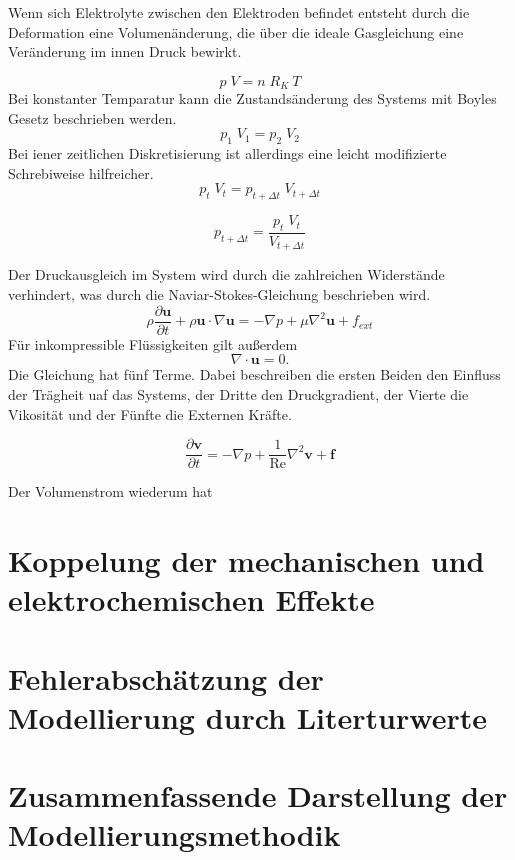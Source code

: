 Wenn sich Elektrolyte zwischen den Elektroden befindet entsteht durch die Deformation eine Volumenänderung, die über die ideale Gasgleichung eine Veränderung im innen Druck bewirkt.

\begin{equation}
    p\;V = n \; R_{K} \ T
\end{equation}
Bei konstanter Temparatur kann die Zustandsänderung des Systems mit Boyles Gesetz beschrieben werden. 
\begin{equation}
    p_1 \; V_1 = p_2 \; V_2
\end{equation}
Bei iener zeitlichen Diskretisierung ist allerdings eine leicht modifizierte Schrebiweise hilfreicher.
\begin{equation}
    p_{t} \; V_{t} = p_{t+\Delta t} \; V_{t+\Delta t}
\end{equation}

\begin{equation}
    p_{t+\Delta t}   = \frac{p_{t} \; V_{t}}{V_{t+\Delta t}}
\end{equation}

Der Druckausgleich im System wird durch die zahlreichen Widerstände verhindert, was durch die Naviar-Stokes-Gleichung beschrieben wird.
\begin{equation}
    \rho \frac{\partial \boldsymbol{u}}{\partial t} + \rho \boldsymbol{u} \cdot \nabla \boldsymbol{u} = -\nabla p + \mu \nabla^2\boldsymbol{u} + f_{ext}
\end{equation}
Für inkompressible Flüssigkeiten gilt außerdem
\begin{equation}
    \nabla \cdot \boldsymbol{u} = 0.
\end{equation}
Die Gleichung hat fünf Terme. Dabei beschreiben die ersten Beiden den Einfluss der Trägheit uaf das Systems, der Dritte den Druckgradient, der Vierte die Vikosität und der Fünfte die Externen Kräfte. 

\begin{equation}
    \frac{\partial \boldsymbol{v}}{ \partial t} = - \nabla p + \frac{1}{\text{Re}} \nabla^2\boldsymbol{v} + \boldsymbol{f}
\end{equation}

Der Volumenstrom wiederum hat 

\section{Koppelung der mechanischen und elektrochemischen Effekte}


\section{Fehlerabschätzung der Modellierung durch Literturwerte}

\section{Zusammenfassende Darstellung der Modellierungsmethodik}
